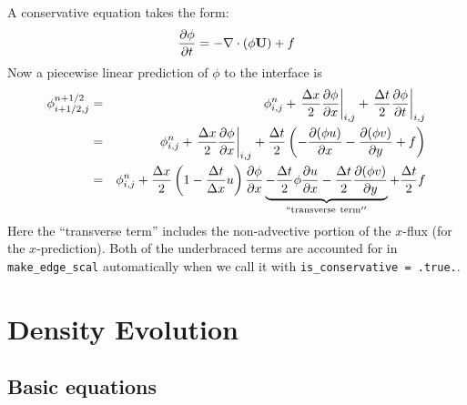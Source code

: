 A conservative equation takes the form:
\begin{equation}
\frac{\partial \phi}{\partial t} = -\nabla \cdot ( \phi {\bf U}) + f
\end{equation}
%
Now a piecewise linear prediction of $\phi$ to the interface is 
\begin{eqnarray}
\phi_{i+1/2,j}^{n+1/2} &=& \phi_{i,j}^n 
    + \left . \frac{\Delta x}{2} \frac{\partial \phi}{\partial x} \right |_{i,j}
    + \left . \frac{\Delta t}{2} \frac{\partial \phi}{\partial t} \right |_{i,j} \\
 &=& \phi_{i,j}^n 
    + \left . \frac{\Delta x}{2} \frac{\partial \phi}{\partial x} \right |_{i,j}
    +  \frac{\Delta t}{2} \left ( -\frac{\partial (\phi u)}{\partial x} 
                                  -\frac{\partial (\phi v)}{\partial y} + f \right ) \\
 &=& \phi_{i,j}^n + \frac{\Delta x}{2} \left ( 1 - \frac{\Delta t}{\Delta x} u \right ) 
           \frac{\partial \phi}{\partial x} 
    \underbrace{- \frac{\Delta t}{2} \phi \frac{\partial u}{\partial x} 
                - \frac{\Delta t}{2} \frac{\partial (\phi v)}{\partial y}}_{\mathrm{``transverse~term''}} + \frac{\Delta t}{2} f
\end{eqnarray}
Here the ``transverse term'' includes the non-advective portion of the $x$-flux (for the $x$-prediction).
Both of the underbraced terms are accounted for in {\tt make\_edge\_scal} automatically when
we call it with {\tt is\_conservative = .true.}.


\section{Density Evolution}

\subsection{Basic equations}

